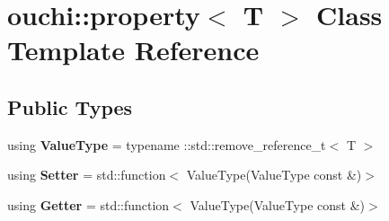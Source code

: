 \hypertarget{classouchi_1_1property}{}\section{ouchi\+::property$<$ T $>$ Class Template Reference}
\label{classouchi_1_1property}
\subsection*{Public Types}
\begin{DoxyCompactItemize}
\item 
\mbox{\label{classouchi_1_1property_a8f7ca3696b23bcd175a9d50002eabab4}} 
using {\bfseries Value\+Type} = typename \+::std\+::remove\+\_\+reference\+\_\+t$<$ T $>$
\item 
\mbox{\label{classouchi_1_1property_a9dfbf92516cda475663966220b316d0e}} 
using {\bfseries Setter} = std\+::function$<$ Value\+Type(Value\+Type const \&)$>$
\item 
\mbox{\label{classouchi_1_1property_a832b5221041162188d224002bac935d2}} 
using {\bfseries Getter} = std\+::function$<$ Value\+Type(Value\+Type const \&)$>$
\end{DoxyCompactItemize}
